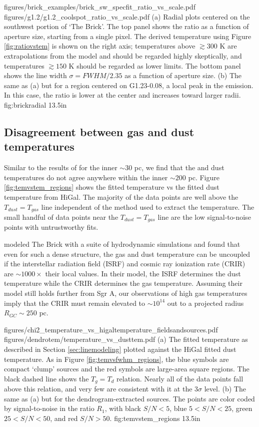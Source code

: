 \FigureTwo
{figures/brick_examples/brick_sw_specfit_ratio_vs_scale.pdf}
{figures/g1.2/g1.2_coolspot_ratio_vs_scale.pdf}
{(a) Radial plots centered on the southwest portion of `The Brick'.
The top panel shows the ratio \Rone as a function of aperture size, starting
from a single pixel.
The derived temperature using Figure \ref{fig:ratiovstem} is shown on the right
axis; temperatures above $\gtrsim300$ K are extrapolations from the model and
should be regarded highly skeptically, and temperatures $\gtrsim150$ K should
be regarded as lower limits.
The bottom panel shows the line width $\sigma = FWHM/2.35$
as a function of aperture size.  
(b) The same as (a) but for a region centered on G1.23-0.08, a local
peak in the \para \threeohthree emission.  In this case,
the ratio \Rone is lower at the center and increases toward larger radii.
}
{fig:brickradial}
{1}{3.5in}



\subsection{Disagreement between gas and dust temperatures}
Similar to the results of \citet{Ao2013a} for the inner $\sim30$ pc, we find
that the \para and dust temperatures do not agree anywhere within the inner
$\sim200$ pc.  Figure \ref{fig:temvstem_regions} shows the fitted \para
temperature vs the fitted dust temperature from HiGal.  The majority of the
\formaldehyde data points are well above the $T_{dust}=T_{gas}$ line
independent of the method used to extract the temperature.  The small handful
of data points near the $T_{dust}=T_{gas}$ line are the low signal-to-noise
points with untrustworthy fits.

\citet{Clark2013a} modeled The Brick with a suite of hydrodynamic simulations
and found that even for such a dense structure, the gas and dust temperature
can be uncoupled if the interstellar radiation field (ISRF) and cosmic ray
ionization rate (CRIR) are $\sim1000\times$ their local values.  In their
model, the ISRF determines the dust temperature while the CRIR determines the
gas temperature.  Assuming their model still holds further from Sgr A, our
observations of high gas temperatures imply that the CRIR must remain elevated
to $\sim10^{14}$ out to a projected radius $R_{GC} \sim 250$ pc.

\FigureTwo
{figures/chi2_temperature_vs_higaltemperature_fieldsandsources.pdf} %
{figures/dendrotem/temperature_vs_dusttem.pdf} %
{(a) The fitted temperature as described in Section \ref{sec:linemodeling} plotted
against the HiGal fitted dust temperature.  As in Figure \ref{fig:temvsfwhm_regions},
the blue symbols are compact `clump' sources and the red symbols are large-area
square regions.  The black dashed line shows the $T_g = T_d$ relation.  Nearly
all of the data points fall above this relation, and very few are consistent
with it at the 3$\sigma$ level.
(b) The same as (a) but for the dendrogram-extracted sources.
The points are color coded by signal-to-noise in the
ratio $R_1$, with black $S/N < 5$, blue $5 < S/N < 25$, green $25 < S/N < 50$,
and red $S/N > 50$.  }
{fig:temvstem_regions}
{1}{3.5in}

